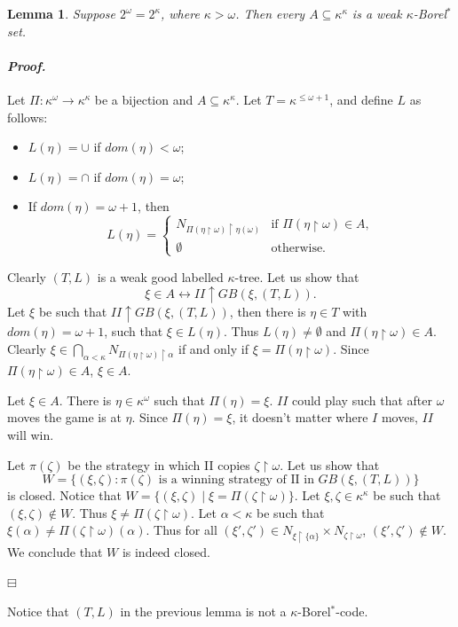 \documentclass[12pt,a4paper]{amsart}
\newtheorem{lemma}[thm]{Lemma}
\theoremstyle{definition}
\theoremstyle{remark}
\renewcommand{\mid}{\mathrel{|}\allowbreak}
\renewcommand{\restriction}{\mathbin\upharpoonright}
\newenvironment{cproof}{\paragraph{\emph{Proof.\,}}}{\hfill{$\boxminus$}\par\vspace{2mm}}
\def\borelstar{Borel\nobreak\hspace{1pt}$^*$}
\begin{document}
\begin{lemma}
    Suppose $2^\omega=2^{\kappa}$, where $\kappa>\omega$. Then every $A\subseteq \kappa^\kappa$ is a weak $\kappa$-\borelstar set.
\end{lemma}
\begin{cproof}
    Let $\Pi:\kappa^\omega\rightarrow\kappa^\kappa$ be a bijection and $A\subseteq\kappa^\kappa$. Let $T=\kappa^{\leq\omega+1}$, and define $L$ as follows:
    \begin{itemize}
        \item $L(\eta)=\cup$ if $dom(\eta)<\omega$;
        \item $L(\eta)=\cap$ if $dom(\eta)=\omega$;
        \item If $dom(\eta)=\omega+1$, then 
        $$L(\eta)=\begin{cases}     N_{\Pi(\eta\restriction\omega)\restriction\eta(\omega)} &\mbox{if } \Pi(\eta\restriction\omega)\in A,\\
        \emptyset &\mbox{otherwise. }\end{cases}$$  
    \end{itemize}
    Clearly $(T,L)$ is a weak good labelled $\kappa$-tree. Let us show that $$\xi\in A\leftrightarrow II\uparrow GB(\xi,(T,L)).$$ Let $\xi$ be such that $II\uparrow GB(\xi,(T,L))$, then there is $\eta\in T$ with $dom(\eta)=\omega+1$, such that $\xi\in L(\eta)$. Thus $L(\eta)\neq\emptyset$ and $\Pi(\eta\restriction\omega)\in A$. Clearly $\xi\in \bigcap_{\alpha<\kappa}N_{\Pi(\eta\restriction\omega)\restriction\alpha}$ if and only if $\xi=\Pi(\eta\restriction\omega)$. Since $\Pi(\eta\restriction\omega)\in A$, $\xi\in A$. 

    Let $\xi\in A$. There is $\eta\in \kappa^\omega$ such that $\Pi(\eta)=\xi$. $II$ could play such that after $\omega$ moves the game is at $\eta$. Since $\Pi(\eta)=\xi$, it doesn't matter where $I$ moves, $II$ will win.

     Let $\pi(\zeta)$ be the strategy in which II copies $\zeta\restriction\omega$. Let us show that $$W=\{(\xi,\zeta) : \pi(\zeta)\mbox{ is a winning strategy of II in }GB(\xi,(T,L))\}$$ is 
     closed. Notice that $W=\{(\xi,\zeta)\mid \xi=\Pi(\zeta\restriction\omega)\}$. Let $\xi,\zeta\in \kappa^\kappa$ be such that $(\xi,\zeta)\notin W$. Thus $\xi\neq\Pi(\zeta\restriction\omega)$. Let $\alpha<\kappa$ be such that $\xi(\alpha)\neq\Pi(\zeta\restriction\omega)(\alpha)$. Thus for all $(\xi',\zeta')\in N_{\xi\restriction\{\alpha\}}\times N_{\zeta\restriction\omega}$, $(\xi',\zeta')\notin W$. We conclude that $W$ is indeed closed.
    
\end{cproof}
Notice that $(T,L)$ in the previous lemma is not a $\kappa$-\borelstar-code.
\end{document}
